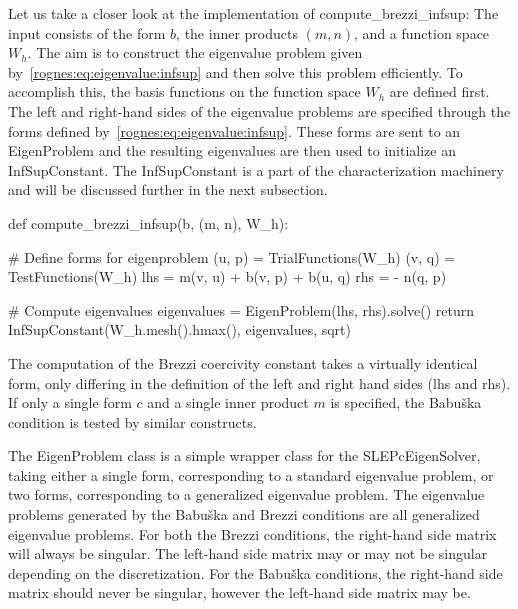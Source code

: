 Let us take a closer look at the implementation of
\textrm{compute\_brezzi\_infsup}: The input consists of the form $b$,
the inner products $(m, n)$, and a function space $W_h$. The aim is to
construct the eigenvalue problem given by~\eqref{rognes:eq:eigenvalue:infsup}
and then solve this problem efficiently. To accomplish this, the basis
functions on the function space $W_h$ are defined first. The left and
right-hand sides of the eigenvalue problems are specified through the
forms defined by~\eqref{rognes:eq:eigenvalue:infsup}. These forms are sent to
an \textrm{EigenProblem} and the resulting eigenvalues are then used
to initialize an \textrm{InfSupConstant}. The InfSupConstant is a part
of the characterization machinery and will be discussed further in the
next subsection.
\begin{python}
def compute_brezzi_infsup(b, (m, n), W_h):

    # Define forms for eigenproblem
    (u, p) = TrialFunctions(W_h)
    (v, q) = TestFunctions(W_h)
    lhs = m(v, u) + b(v, p) + b(u, q)
    rhs = - n(q, p)

    # Compute eigenvalues
    eigenvalues = EigenProblem(lhs, rhs).solve()
    return InfSupConstant(W_h.mesh().hmax(), eigenvalues, sqrt)
\end{python}
The computation of the Brezzi coercivity constant takes a virtually
identical form, only differing in the definition of the left and right
hand sides (lhs and rhs). If only a single form $c$ and a single inner
product $m$ is specified, the Babu\v ska condition is tested by
similar constructs.

The \textrm{EigenProblem} class is a simple wrapper class for the
\dolfin{} \textrm{SLEPcEigenSolver}, taking either a single form,
corresponding to a standard eigenvalue problem, or two forms,
corresponding to a generalized eigenvalue problem. The eigenvalue
problems generated by the Babu\v ska and Brezzi conditions are all
generalized eigenvalue problems. For both the Brezzi conditions, the
right-hand side matrix will always be singular. The left-hand side
matrix may or may not be singular depending on the discretization. For
the Babu\v ska conditions, the right-hand side matrix should never be
singular, however the left-hand side matrix may be.

